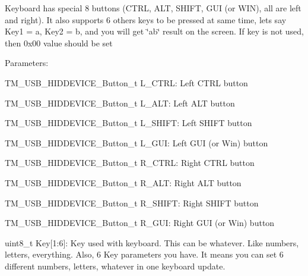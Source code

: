 Keyboard has special 8 buttons (C\+T\+R\+L, A\+L\+T, S\+H\+I\+F\+T, G\+U\+I (or W\+I\+N), all are left and right). It also supports 6 others keys to be pressed at same time, let\textquotesingle{}s say Key1 = \textquotesingle{}a\textquotesingle{}, Key2 = \textquotesingle{}b\textquotesingle{}, and you will get \char`\"{}ab\char`\"{} result on the screen. If key is not used, then 0x00 value should be set

Parameters\+:
\begin{DoxyItemize}
\item T\+M\+\_\+\+U\+S\+B\+\_\+\+H\+I\+D\+D\+E\+V\+I\+C\+E\+\_\+\+Button\+\_\+t L\+\_\+\+C\+T\+R\+L\+: Left C\+T\+R\+L button
\item T\+M\+\_\+\+U\+S\+B\+\_\+\+H\+I\+D\+D\+E\+V\+I\+C\+E\+\_\+\+Button\+\_\+t L\+\_\+\+A\+L\+T\+: Left A\+L\+T button
\item T\+M\+\_\+\+U\+S\+B\+\_\+\+H\+I\+D\+D\+E\+V\+I\+C\+E\+\_\+\+Button\+\_\+t L\+\_\+\+S\+H\+I\+F\+T\+: Left S\+H\+I\+F\+T button
\item T\+M\+\_\+\+U\+S\+B\+\_\+\+H\+I\+D\+D\+E\+V\+I\+C\+E\+\_\+\+Button\+\_\+t L\+\_\+\+G\+U\+I\+: Left G\+U\+I (or Win) button
\item T\+M\+\_\+\+U\+S\+B\+\_\+\+H\+I\+D\+D\+E\+V\+I\+C\+E\+\_\+\+Button\+\_\+t R\+\_\+\+C\+T\+R\+L\+: Right C\+T\+R\+L button
\item T\+M\+\_\+\+U\+S\+B\+\_\+\+H\+I\+D\+D\+E\+V\+I\+C\+E\+\_\+\+Button\+\_\+t R\+\_\+\+A\+L\+T\+: Right A\+L\+T button
\item T\+M\+\_\+\+U\+S\+B\+\_\+\+H\+I\+D\+D\+E\+V\+I\+C\+E\+\_\+\+Button\+\_\+t R\+\_\+\+S\+H\+I\+F\+T\+: Right S\+H\+I\+F\+T button
\item T\+M\+\_\+\+U\+S\+B\+\_\+\+H\+I\+D\+D\+E\+V\+I\+C\+E\+\_\+\+Button\+\_\+t R\+\_\+\+G\+U\+I\+: Right G\+U\+I (or Win) button
\item uint8\+\_\+t Key\mbox{[}1\+:6\mbox{]}\+: Key used with keyboard. This can be whatever. Like numbers, letters, everything. Also, 6 Key parameters you have. It means you can set 6 different numbers, letters, whatever in one keyboard update. 
\end{DoxyItemize}